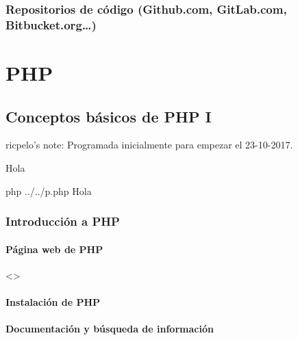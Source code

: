 \documentclass[a4paper,12pt,spanish]{sphinxmanual}
\begin{document}
\section{Repositorios de código (Github.com, GitLab.com, Bitbucket.org…)}
\label{\detokenize{introduccion:repositorios-de-codigo-github-com-gitlab-com-bitbucket-org}}

\part{PHP}
\label{\detokenize{php:php}}\label{\detokenize{php::doc}}

\chapter{Conceptos básicos de PHP I}
\label{\detokenize{php:conceptos-basicos-de-php-i}}
ricpelo’s note: Programada inicialmente para empezar el 23-10-2017.

\begin{sphinxVerbatim}[commandchars=\\\{\}]
Hola
\end{sphinxVerbatim}

\begin{sphinxVerbatim}[commandchars=\\\{\}]
\PYGZdl{} php ../../p.php
Hola
\end{sphinxVerbatim}


\section{Introducción a PHP}
\label{\detokenize{php:introduccion-a-php}}

\subsection{Página web de PHP}
\label{\detokenize{php:pagina-web-de-php}}
\textless{}\textgreater{}


\subsection{Instalación de PHP}
\label{\detokenize{php:instalacion-de-php}}

\subsection{Documentación y búsqueda de información}
\label{\detokenize{php:documentacion-y-busqueda-de-informacion}}
\end{document}
